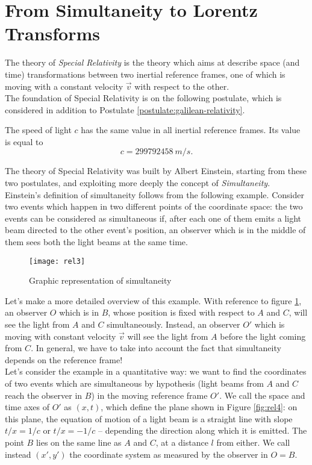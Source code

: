 \section{From Simultaneity to Lorentz Transforms}
The theory of \emph{Special Relativity} is the theory which aims at describe space (and time) transformations between two inertial reference frames, one of which is moving with a constant velocity $\vec{v}$ with respect to the other.\\

The foundation of Special Relativity is on the following postulate, which is considered in addition to Postulate \ref{postulate:galilean-relativity}.

\begin{postulate}[Invariance of $c$]
  \label{postulate:invariance-of-c}
  The speed of light $c$ has the same value in all inertial reference frames. Its value is equal to
  \[c = \SI{299792458}{m/s}.\]
\end{postulate}

The theory of Special Relativity was built by Albert Einstein, starting from these two postulates, and exploiting more deeply the concept of \emph{Simultaneity}.
Einstein's definition of simultaneity follows from the following example. Consider two events which happen in two different points of the coordinate space: the two events can be considered as simultaneous if, after each one of them emits a light beam directed to the other event's position, an observer which is in the middle of them sees both the light beams at the same time.\\

\begin{figure}
  \centering
  \texttt{[image: rel3]}
\caption{Graphic representation of simultaneity}  \label{fig:rel3}
\end{figure}{}

Let's make a more detailed overview of this example. With reference to figure \ref{fig:rel3}, an observer $O$ which is in $B$, whose position is fixed with respect to $A$ and $C$, will see the light from $A$ and $C$ simultaneously. Instead, an observer $O'$ which is moving with constant velocity $\vec{v}$ will see the light from $A$ before the light coming from $C$. In general, we have to take into account the fact that simultaneity depends on the reference frame!\\

Let's consider the example in a quantitative way: we want to find the coordinates of two events which are simultaneous by hypothesis (light beams from $A$ and $C$ reach the observer in $B$) in the moving reference frame $O'$. We call the space and time axes of $O'$ as $(x,t)$, which define the plane shown in Figure \ref{fig:rel4}: on this plane, the equation of motion of a light beam is a straight line with slope $t/x=1/c$ or $t/x=-1/c$ -- depending the direction along which it is emitted. The point $B$ lies on the same line as $A$ and $C$, at a distance $l$ from either. We call instead $(x', y')$ the coordinate system as measured by the observer in $O=B$.

